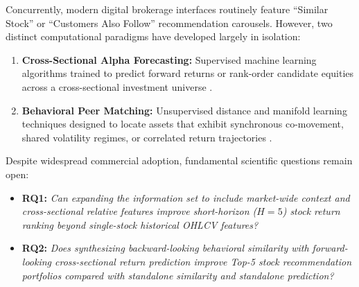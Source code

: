 \documentclass[11pt,a4paper]{article}
\begin{document}
Concurrently, modern digital brokerage interfaces routinely feature ``Similar Stock'' or ``Customers Also Follow'' recommendation carousels. However, two distinct computational paradigms have developed largely in isolation:
\begin{enumerate}
    \item \textbf{Cross-Sectional Alpha Forecasting:} Supervised machine learning algorithms trained to predict forward returns or rank-order candidate equities across a cross-sectional investment universe \cite{gu2020empirical}.
    \item \textbf{Behavioral Peer Matching:} Unsupervised distance and manifold learning techniques designed to locate assets that exhibit synchronous co-movement, shared volatility regimes, or correlated return trajectories \cite{ledoit2004honey}.
\end{enumerate}

Despite widespread commercial adoption, fundamental scientific questions remain open:
\begin{itemize}
    \item \textbf{RQ1:} \emph{Can expanding the information set to include market-wide context and cross-sectional relative features improve short-horizon ($H=5$) stock return ranking beyond single-stock historical OHLCV features?}
    \item \textbf{RQ2:} \emph{Does synthesizing backward-looking behavioral similarity with forward-looking cross-sectional return prediction improve Top-5 stock recommendation portfolios compared with standalone similarity and standalone prediction?}
\end{itemize}
\end{document}
